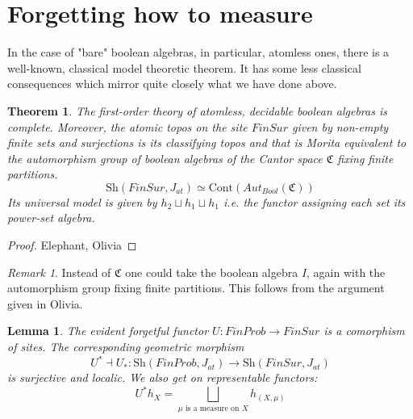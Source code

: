 \documentclass[a4paper]{amsproc}
\theoremstyle{plain}
\newtheorem{theorem}{Theorem}[section]
\newtheorem{lemma}{Lemma}[section]
\theoremstyle{definition}
\theoremstyle{remark}
\newtheorem{remark}{Remark}[section]
\numberwithin{equation}{section}
\begin{document}
\section{Forgetting how to measure}
In the case of "bare" boolean algebras, in particular, atomless ones, there is a well-known, classical model theoretic theorem. It has some less classical consequences which mirror quite closely what we have done above.
\begin{theorem} The first-order theory of atomless, decidable boolean algebras is complete. Moreover, the atomic topos on the site  $FinSur$ given by non-empty finite sets and surjections is its classifying topos and that is Morita equivalent to the automorphism group of boolean algebras of the Cantor space $\mathfrak{C}$ fixing finite partitions.
\[ \text{Sh}(FinSur, J_{at})\simeq \text{Cont}(Aut_{Bool}(\mathfrak{C}))\]
Its universal model is given by $h_2\sqcup h_1 \sqcup h_1$ i.e. the functor assigning each set its power-set algebra.
\end{theorem}
\begin{proof}Elephant, Olivia
\end{proof}
\begin{remark} Instead of $\mathfrak{C}$ one could take the boolean algebra $I$, again with the automorphism group fixing finite partitions. This follows from the argument given in Olivia.
\end{remark}
\begin{lemma} The evident forgetful functor $U: FinProb\rightarrow FinSur$ is a comorphism of sites. The corresponding geometric morphism 
\[U^*\dashv U_*: \text{Sh}(FinProb, J_{at})\rightarrow  \text{Sh}(FinSur, J_{at})\]
 is surjective and localic. We also get on representable functors:
 \[U^*h_X=\bigsqcup_{\mu\text{ is a measure on }X}h_{(X,\mu)}\]
\end{lemma}
\end{document}
